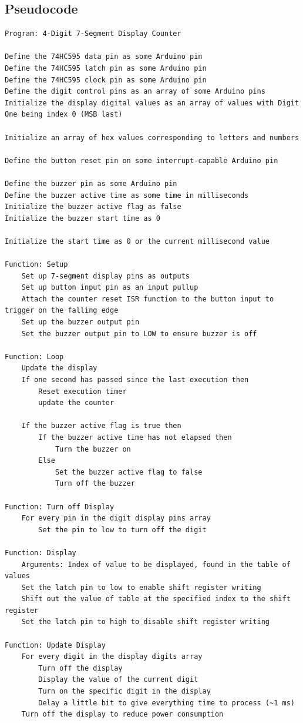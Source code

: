     \subsection*{Pseudocode}
    \begin{lstlisting}[linewidth=1.5\textwidth]
Program: 4-Digit 7-Segment Display Counter

Define the 74HC595 data pin as some Arduino pin
Define the 74HC595 latch pin as some Arduino pin
Define the 74HC595 clock pin as some Arduino pin
Define the digit control pins as an array of some Arduino pins
Initialize the display digital values as an array of values with Digit One being index 0 (MSB last)

Initialize an array of hex values corresponding to letters and numbers

Define the button reset pin on some interrupt-capable Arduino pin

Define the buzzer pin as some Arduino pin
Define the buzzer active time as some time in milliseconds
Initialize the buzzer active flag as false
Initialize the buzzer start time as 0

Initialize the start time as 0 or the current millisecond value

Function: Setup
    Set up 7-segment display pins as outputs
    Set up button input pin as an input pullup
    Attach the counter reset ISR function to the button input to trigger on the falling edge
    Set up the buzzer output pin
    Set the buzzer output pin to LOW to ensure buzzer is off

Function: Loop
    Update the display
    If one second has passed since the last execution then
        Reset execution timer
        update the counter
    
    If the buzzer active flag is true then
        If the buzzer active time has not elapsed then
            Turn the buzzer on
        Else
            Set the buzzer active flag to false
            Turn off the buzzer

Function: Turn off Display
    For every pin in the digit display pins array
        Set the pin to low to turn off the digit

Function: Display
    Arguments: Index of value to be displayed, found in the table of values
    Set the latch pin to low to enable shift register writing
    Shift out the value of table at the specified index to the shift register
    Set the latch pin to high to disable shift register writing

Function: Update Display
    For every digit in the display digits array
        Turn off the display
        Display the value of the current digit
        Turn on the specific digit in the display
        Delay a little bit to give everything time to process (~1 ms)
    Turn off the display to reduce power consumption


\end{lstlisting}
